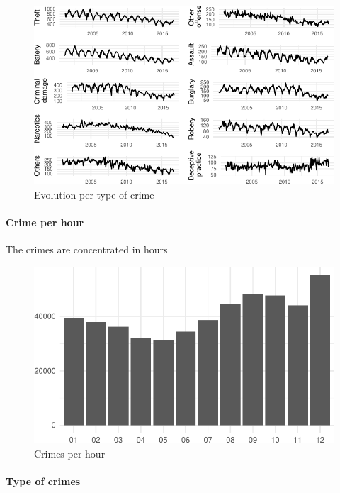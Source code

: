\documentclass[]{article}
\let\oldparagraph\paragraph
\renewcommand{\paragraph}[1]{\oldparagraph{#1}\mbox{}}
\begin{document}
\begin{figure}[H]

{\centering \includegraphics{Assessment_1v8_files/figure-latex/fig2-1} 

}

\caption{Evolution per type of crime}\label{fig:fig2}
\end{figure}

\paragraph{Crime per hour}\label{crime-per-hour}

The crimes are concentrated in hours

\begin{figure}[H]
\includegraphics{Assessment_1v8_files/figure-latex/fig3-1} \caption{Crimes per hour}\label{fig:fig3}
\end{figure}

\paragraph{Type of crimes}\label{type-of-crimes}
\end{document}
